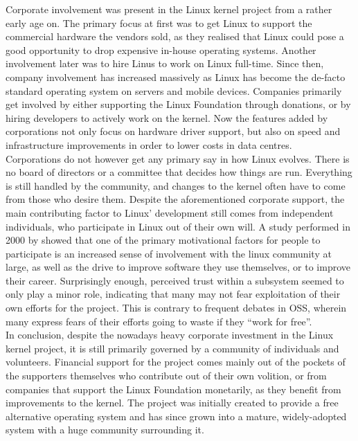 Corporate involvement was present in the Linux kernel project from a rather early age on\cite{linus-biography}. The primary focus at first was to get Linux to support the commercial hardware the vendors sold, as they realised that Linux could pose a good opportunity to drop expensive in-house operating systems. Another involvement later was to hire Linus to work on Linux full-time. Since then, company involvement has increased massively as Linux has become the de-facto standard operating system on servers\cite{linux-server} and mobile devices\cite{linux-usage}. Companies primarily get involved by either supporting the Linux Foundation through donations\cite{linux-foundation}, or by hiring developers to actively work on the kernel\cite{linux-whowrites}. Now the features added by corporations not only focus on hardware driver support, but also on speed and infrastructure improvements in order to lower costs in data centres\cite{linux-bbr}. \\

Corporations do not however get any primary say in how Linux evolves. There is no board of directors or a committee that decides how things are run. Everything is still handled by the community, and changes to the kernel often have to come from those who desire them. Despite the aforementioned corporate support, the main contributing factor to Linux' development still comes from independent individuals, who participate in Linux out of their own will. A study performed in 2000 by \citet{linux-motivation} showed that one of the primary motivational factors for people to participate is an increased sense of involvement with the linux community at large, as well as the drive to improve software they use themselves, or to improve their career. Surprisingly enough, perceived trust within a subsystem seemed to only play a minor role, indicating that many may not fear exploitation of their own efforts for the project. This is contrary to frequent debates in OSS, wherein many express fears of their efforts going to waste if they ``work for free''. \\

In conclusion, despite the nowadays heavy corporate investment in the Linux kernel project, it is still primarily governed by a community of individuals and volunteers. Financial support for the project comes mainly out of the pockets of the supporters themselves who contribute out of their own volition, or from companies that support the Linux Foundation monetarily, as they benefit from improvements to the kernel. The project was initially created to provide a free alternative operating system and has since grown into a mature, widely-adopted system with a huge community surrounding it.

